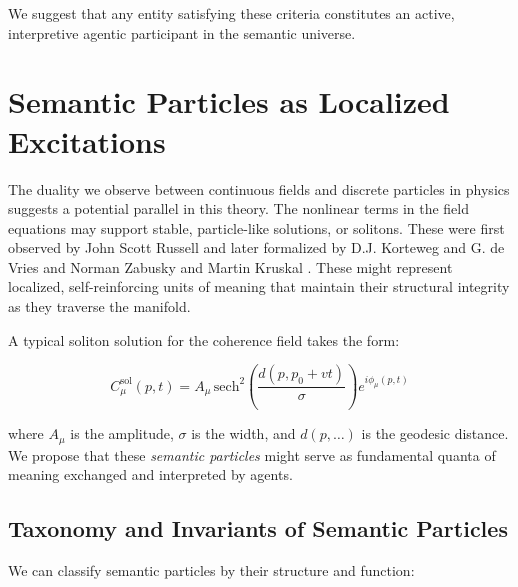 We suggest that any entity satisfying these criteria constitutes an active, interpretive agentic participant in the semantic universe.


\section{Semantic Particles as Localized Excitations}
\label{13.6:semantic_particles_as_localized_excitations}

The duality we observe between continuous fields and discrete particles in physics suggests a potential parallel in this theory. The nonlinear terms in the field equations may support stable, particle-like solutions, or solitons. These were first observed by John Scott Russell \autocite{Russell1845} and later formalized by D.J. Korteweg and G. de Vries \autocite{KortewegdeVries1895} and Norman Zabusky and Martin Kruskal \autocite{ZabuskyKruskal1965}. These might represent localized, self-reinforcing units of meaning that maintain their structural integrity as they traverse the manifold.

A typical soliton solution for the coherence field takes the form:

\begin{equation}
C_\mu^{\mathrm{sol}}(p, t) = A_\mu\, \mathrm{sech}^2\left(\frac{d(p, p_0 + vt)}{\sigma}\right) e^{i\phi_\mu(p, t)}
\end{equation}

where \(A_\mu\) is the amplitude, \(\sigma\) is the width, and \(d(p, \dots)\) is the geodesic distance. We propose that these \textit{semantic particles} might serve as fundamental quanta of meaning exchanged and interpreted by agents.


\subsection{Taxonomy and Invariants of Semantic Particles}
\label{13.6.1:taxonomy_and_invariants_of_semantic_particles}

We can classify semantic particles by their structure and function:

